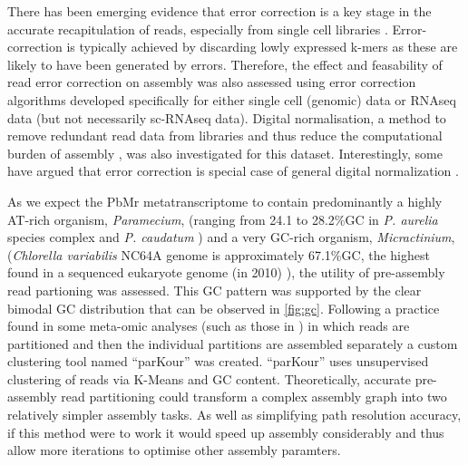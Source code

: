 There has been emerging evidence that error correction is a key stage in the accurate
recapitulation of reads, especially from single cell libraries \citep{Medvedev2011}.  
Error-correction is typically achieved by discarding lowly expressed k-mers 
as these are likely to have been generated by errors.
Therefore, the effect and feasability 
of read error correction on assembly was also assessed using error correction algorithms developed specifically for either 
single cell (genomic) data or RNAseq data (but not necessarily sc-RNAseq data).
Digital normalisation, a method to remove redundant read data from libraries and thus
reduce the computational burden of assembly \citep{Brown2012}, was also investigated for this dataset.
Interestingly, some have argued that error correction is special case of general digital normalization
\citep{Krasileva2013}.


As we expect the PbMr metatranscriptome to contain predominantly a highly AT-rich organism, \textit{Paramecium},
(ranging from 24.1 to 28.2\%GC in \textit{P. aurelia} species complex and \textit{P. caudatum} \citep{Aury2006,McGrath2014})
and a very GC-rich organism, \textit{Micractinium}, (\textit{Chlorella variabilis} NC64A genome is approximately 67.1\%GC, the highest
found in a sequenced eukaryote genome (in 2010) \citep{Blanc2010}), the utility of pre-assembly read partioning was assessed.
This GC pattern was supported by the clear bimodal GC distribution that can be observed in \ref{fig:gc}.
Following a practice found in some meta-omic analyses (such as those in \citep{Droge2012}) in which reads
are partitioned and then the individual partitions are assembled separately a custom clustering
tool named ``parKour'' was created.  ``parKour'' uses unsupervised clustering of reads via K-Means 
and GC content.  Theoretically, accurate
pre-assembly read partitioning could transform a complex assembly graph into two relatively simpler
assembly tasks.  As well as simplifying path resolution accuracy, if this method were to work
it would speed up assembly considerably and thus allow more iterations to optimise other
assembly paramters.

